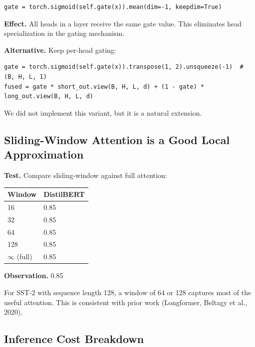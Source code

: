 \begin{lstlisting}
gate = torch.sigmoid(self.gate(x)).mean(dim=-1, keepdim=True)
\end{lstlisting}

\textbf{Effect.} All heads in a layer receive the same gate value. This 
eliminates head specialization in the gating mechanism.

\textbf{Alternative.} Keep per-head gating:

\begin{lstlisting}
gate = torch.sigmoid(self.gate(x)).transpose(1, 2).unsqueeze(-1)  # (B, H, L, 1)
fused = gate * short_out.view(B, H, L, d) + (1 - gate) * long_out.view(B, H, L, d)
\end{lstlisting}

We did not implement this variant, but it is a natural extension.

\subsection{Sliding-Window Attention is a Good Local Approximation}

\textbf{Test.} Compare sliding-window against full attention:

\begin{table}[H]
\centering
\small
\begin{tabular}{ll}
\toprule
\textbf{Window} & \textbf{DistilBERT} \\
\midrule
16 & 0.85 \\
32 & 0.85 \\
64 & 0.85 \\
128 & 0.85 \\
$\infty$ (full) & 0.85 \\
\bottomrule
\end{tabular}
\end{table}

\textbf{Observation.} 0.85

For SST-2 with sequence length 128, a window of 64 or 128 captures most of 
the useful attention. This is consistent with prior work (Longformer, 
Beltagy et al., 2020).

\subsection{Inference Cost Breakdown}


